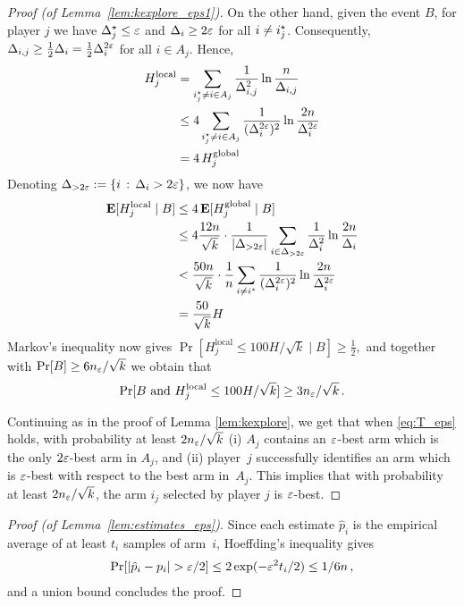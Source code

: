\documentclass{article} %
\newcommand{\phat}{\hat{p}}
\begin{document}
\begin{proof}[Proof (of Lemma~\ref{lem:kexplore_eps1})]
On the other hand, given the event $B$, for player $j$ we have $\Delta_j^\star \le \varepsilon$ and $\Delta_i \ge 2\varepsilon$ for all $i \ne i_j^\star$.
Consequently, $\Delta_{i,j} \ge \tfrac{1}{2} \Delta_i =  \tfrac{1}{2} \Delta_i^{2\varepsilon}$ for all $i \in A_j$.
Hence,
\begin{align*}
	H_j^\text{local}
	&= \sum_{i^\star_j \ne i \in A_j} \frac{1}{\Delta_{i,j}^2} \ln \frac{n}{\Delta_{i,j}} \\
	&\le 4 \sum_{i^\star_j \ne i \in A_j} \frac{1}{(\Delta_i^{2\varepsilon})^2} \ln \frac{2n}{\Delta_i^{2\varepsilon}} \\
	&= 4 \, H_j^\text{global}
\end{align*}
Denoting $\Delta_{> 2\varepsilon} := \{i \,:\, \Delta_i > 2\varepsilon\}$, we now have 
\begin{align*}
	\mathbf{E}[H_j^\text{local} \mid B]
	&\le 4 \, \mathbf{E}[H_j^\text{global} \mid B] \\
	&\le 4 \frac{12n}{\sqrt{k}} \cdot 
		\frac{1}{|\Delta_{>2\varepsilon}|} 
			\sum_{i \in \Delta_{>2\varepsilon}} \frac{1}{\Delta_i^2} \ln \frac{2n}{\Delta_i} \\
	&< \frac{50n}{\sqrt{k}} \cdot 
		\frac{1}{n} \sum_{i \ne i^\star} \frac{1}{(\Delta_i^{2\varepsilon})^2} \ln \frac{2n}{\Delta_i^{2\varepsilon}} \\
	&= \frac{50}{\sqrt{k}} H
\end{align*}
Markov's inequality now gives
$
	\Pr[H_j^\text{local} \le 100 H/\sqrt{k} \mid B]
	\ge \tfrac{1}{2} ,
$
and together with $\Pr[B] \ge 6 n_{\varepsilon} / \sqrt{k}$ we obtain that
\begin{align*}
	\Pr[B \mbox{ and } H_j^\text{local} \le 100 H/\sqrt{k} ]
	\ge 3 n_{\varepsilon} / \sqrt{k} \,.
\end{align*}

Continuing as in the proof of Lemma \ref{lem:kexplore}, we get that when \eqref{eq:T_eps} holds, with probability at least $2 n_{\varepsilon} / \sqrt{k}$
(i) $A_j$ contains an $\varepsilon$-best arm which is the only $2\varepsilon$-best arm in $A_j$, and
(ii) player~$j$ successfully identifies an arm which is $\varepsilon$-best with respect to the best arm in~$A_j$. 
This implies that with probability at least $2 n_{\varepsilon} / \sqrt{k}$, the arm $i_j$ selected by player $j$ is $\varepsilon$-best.
\end{proof}



\begin{proof}[Proof (of Lemma~\ref{lem:estimates_eps})]
Since each estimate $\phat_i$ is the empirical average of at least $t_i$ samples of arm~$i$,
Hoeffding's inequality gives
\begin{align*}
	\Pr[\abs{\phat_i - p_i} > \eps/2]
	\le 2 \exp (-\eps^2 t_i/2)
	\le 1/6n \,,
\end{align*}
and a union bound concludes the proof.
\end{proof}
\end{document}
